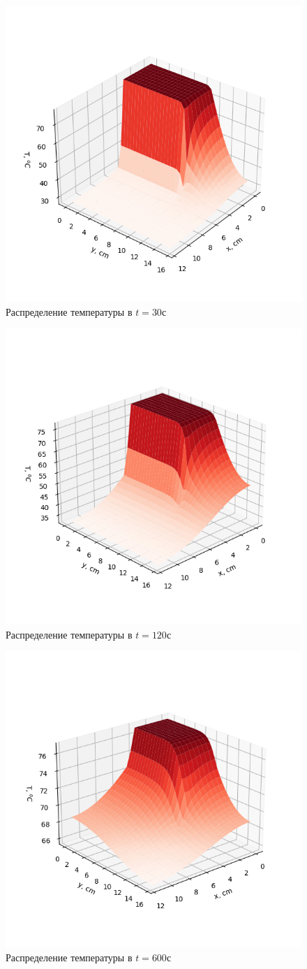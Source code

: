 \begin{figure}[H]
	\center
	\includegraphics[width=.6\linewidth]{imgs_11/30s.png}
	\caption{Распределение температуры в $t=30$с}
	\label{fig:30}
\end{figure}
\begin{figure}[H]
	\center
	\includegraphics[width=.6\linewidth]{imgs_11/120s.png}
	\caption{Распределение температуры в $t=120$с}
	\label{fig:120}
\end{figure}
\begin{figure}[H]
	\center
	\includegraphics[width=.6\linewidth]{imgs_11/600s.png}
	\caption{Распределение температуры в $t=600$с}
	\label{fig:600}
\end{figure}

